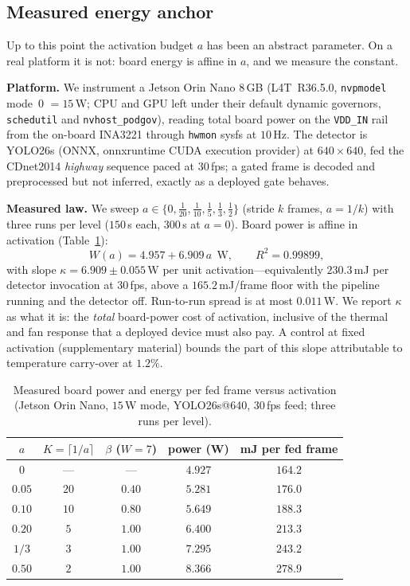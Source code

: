 ﻿\documentclass[lettersize,journal]{IEEEtran}
\begin{document}
\subsection{Measured energy anchor}\label{sec:energy}
Up to this point the activation budget $a$ has been an abstract parameter. On a real platform it is not: board energy is affine in $a$, and we measure the constant.

\textbf{Platform.} We instrument a Jetson Orin Nano 8\,GB (L4T~R36.5.0, \texttt{nvpmodel} mode~0 $=15$\,W; CPU and GPU left under their default dynamic governors, \texttt{schedutil} and \texttt{nvhost\_podgov}), reading total board power on the \texttt{VDD\_IN} rail from the on-board INA3221 through \texttt{hwmon} sysfs at $10$\,Hz. The detector is YOLO26s (ONNX, onnxruntime CUDA execution provider) at $640{\times}640$, fed the CDnet2014 \emph{highway} sequence paced at $30$\,fps; a gated frame is decoded and preprocessed but not inferred, exactly as a deployed gate behaves.

\textbf{Measured law.} We sweep $a\in\{0,\tfrac1{20},\tfrac1{10},\tfrac15,\tfrac13,\tfrac12\}$ (stride $k$ frames, $a=1/k$) with three runs per level ($150$\,s each, $300$\,s at $a{=}0$). Board power is affine in activation (Table~\ref{tab:energy}):
\begin{equation}\label{eq:energy}
W(a)=4.957+6.909\,a\ \ \text{W},\qquad R^2=0.99899,
\end{equation}
with slope $\kappa=6.909\pm0.055$\,W per unit activation---equivalently $230.3$\,mJ per detector invocation at $30$\,fps, above a $165.2$\,mJ/frame floor with the pipeline running and the detector off. Run-to-run spread is at most $0.011$\,W. We report $\kappa$ as what it is: the \emph{total} board-power cost of activation, inclusive of the thermal and fan response that a deployed device must also pay. A control at fixed activation (supplementary material) bounds the part of this slope attributable to temperature carry-over at $1.2\%$.

\begin{table}[!tb]\centering\caption{Measured board power and energy per fed frame versus activation (Jetson Orin Nano, $15$\,W mode, YOLO26s@640, $30$\,fps feed; three runs per level).}\label{tab:energy}
\small
\begin{tabular}{ccccc}
\toprule
$a$ & $K=\lceil1/a\rceil$ & $\beta$ ($W{=}7$) & power (W) & mJ per fed frame\\
\midrule
$0$ & --- & --- & $4.927$ & $164.2$\\
$0.05$ & $20$ & $0.40$ & $5.281$ & $176.0$\\
$0.10$ & $10$ & $0.80$ & $5.649$ & $188.3$\\
$0.20$ & $5$ & $1.00$ & $6.400$ & $213.3$\\
$1/3$ & $3$ & $1.00$ & $7.295$ & $243.2$\\
$0.50$ & $2$ & $1.00$ & $8.366$ & $278.9$\\
\bottomrule
\end{tabular}
\end{table}
\end{document}
